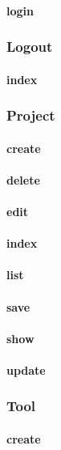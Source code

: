 \documentclass[12pt]{article}
\begin{document}
\paragraph{login}

\subsubsection{Logout}\label{sec:CLogout}
\paragraph{index}

\subsubsection{Project}\label{sec:CProject}
\paragraph{create}
\paragraph{delete}
\paragraph{edit}
\paragraph{index}
\paragraph{list}
\paragraph{save}
\paragraph{show}
\paragraph{update}

\subsubsection{Tool}\label{sec:CTool}
\paragraph{create}
\end{document}
